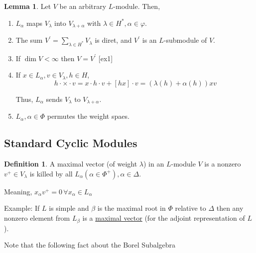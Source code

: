 \documentclass{article}
\theoremstyle{definition}
\newtheorem*{definition}{Definition}
\newtheorem{lemma}[theorem]{Lemma}
\begin{document}
    \begin{lemma}
        Let \(V\) be an arbitrary \(L\)-module. Then,

        \begin{enumerate}[label=\alph*)]
            \item \(L_\alpha\) maps \(V_\lambda\) into \(V_{\lambda + \alpha}\) with \(\lambda \in H^{\ast} , \alpha \in \varphi\).
            
            \item The sum \(V^{\prime} = \sum_{\lambda \in H^{\ast}} V_\lambda\) is diret, and \(V^{\prime}\) is an \(L\)-submodule of \(V\).
            
            \item If \(\dim V < \infty\) then \(V = V^{\prime}\) [ex1]
            
            \item If \(x\in L_\alpha, v \in V_\lambda, h \in H\),
            \[
                h\cdot \times \cdot v = x \cdot h \cdot v + [hx] \cdot v = (\lambda(h) + \alpha(h)) xv
            \]

            Thus, \(L_\alpha\) sends \(V_\lambda\) to \(V_{\lambda+\alpha}\).

            \item \(L_\alpha, \alpha \in \Phi\) permutes the weight spaes.
        \end{enumerate} 
    \end{lemma}
    
    \subsection*{Standard Cyclic Modules}

    \begin{definition}
        A maximal vector (of weight \(\lambda\)) in an \(L\)-module \(V\) is a nonzero \(v^+\in V_\lambda\) is killed by all \(L_\alpha (\alpha \in \Phi^+), \alpha \in \Delta\).

        Meaning, \(x_\alpha v^+ = 0\, \forall x_\alpha \in L_\alpha\) 
    \end{definition}
    
    Example: If \(L\) is simple and \(\beta\) is the maximal root in \(\Phi\) relative to \(\Delta\) then any nonzero element from \(L_\beta\) is a \underline{maximal vector} (for the adjoint representation of \(L\)).

    Note that the following fact about the Borel Subalgebra
\end{document}
